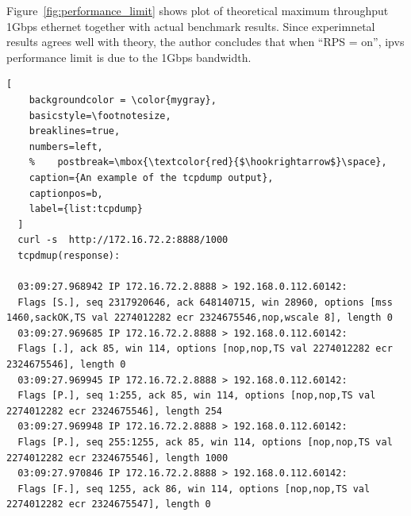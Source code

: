 Figure~\ref{fig:performance_limit} shows plot of theoretical maximum throughput 1Gbps ethernet together with actual benchmark results.
Since experimnetal results agrees well with theory, the author concludes that when \enquote{RPS = on}, ipvs performance limit is due to the 1Gbps bandwidth.

\begin{lstlisting}[
    backgroundcolor = \color{mygray},
    basicstyle=\footnotesize,
    breaklines=true,
    numbers=left,
    %    postbreak=\mbox{\textcolor{red}{$\hookrightarrow$}\space},
    caption={An example of the tcpdump output},
    captionpos=b,
    label={list:tcpdump}
  ]
  curl -s  http://172.16.72.2:8888/1000
  tcpdmup(response):

  03:09:27.968942 IP 172.16.72.2.8888 > 192.168.0.112.60142:
  Flags [S.], seq 2317920646, ack 648140715, win 28960, options [mss 1460,sackOK,TS val 2274012282 ecr 2324675546,nop,wscale 8], length 0
  03:09:27.969685 IP 172.16.72.2.8888 > 192.168.0.112.60142:
  Flags [.], ack 85, win 114, options [nop,nop,TS val 2274012282 ecr 2324675546], length 0
  03:09:27.969945 IP 172.16.72.2.8888 > 192.168.0.112.60142:
  Flags [P.], seq 1:255, ack 85, win 114, options [nop,nop,TS val 2274012282 ecr 2324675546], length 254
  03:09:27.969948 IP 172.16.72.2.8888 > 192.168.0.112.60142:
  Flags [P.], seq 255:1255, ack 85, win 114, options [nop,nop,TS val 2274012282 ecr 2324675546], length 1000
  03:09:27.970846 IP 172.16.72.2.8888 > 192.168.0.112.60142:
  Flags [F.], seq 1255, ack 86, win 114, options [nop,nop,TS val 2274012282 ecr 2324675547], length 0
\end{lstlisting}

